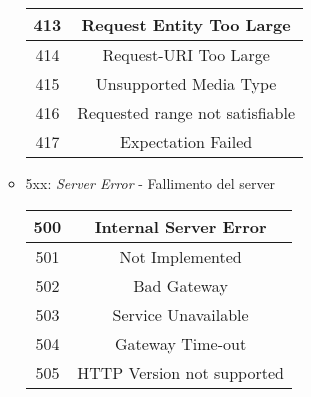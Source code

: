 \documentclass[a4paper,11pt]{article}
\begin{document}
\begin{itemize}
\begin{itemize}
\begin{center}
\begin{tabular}{c|c}
                413 & Request Entity Too Large\\
                \hline
                414 & Request-URI Too Large\\
                \hline
                415 & Unsupported Media Type\\
                \hline
                416 & Requested range not satisfiable\\
                \hline
                417 & Expectation Failed\\
            \end{tabular}
        \end{center}
        \item 5xx: \textit{Server Error} - Fallimento del server
        \begin{center}
            \begin{tabular}{c|c}
                500 & Internal Server Error\\
                \hline
                501 & Not Implemented\\
                \hline
                502 & Bad Gateway\\
                \hline
                503 & Service Unavailable\\
                \hline
                504 & Gateway Time-out\\
                \hline
                505 & HTTP Version not supported
            \end{tabular}
        \end{center}
    \end{itemize}
\end{itemize}
\end{document}
